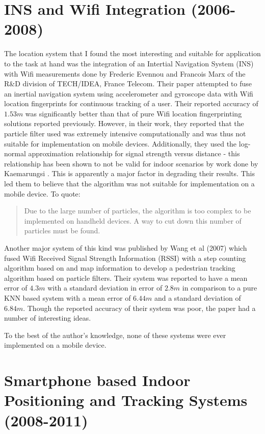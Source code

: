 \section{INS and Wifi Integration (2006-2008)}

The location system that I found the most interesting and suitable for application to the task at hand was the integration of an Intertial Navigation System (INS) with Wifi measurements done by Frederic Evennou and Francois Marx of the R\&D division of TECH/IDEA, France Telecom. Their paper \cite{Evennou} attempted to fuse an inertial navigation system using  accelerometer and gyroscope data with Wifi location fingerprints for continuous tracking of a user. Their reported accuracy of $1.53 m$ was significantly better than that of pure Wifi location fingerprinting solutions reported previously. However, in their work, they reported that the particle filter used was extremely intensive computationally and was thus not suitable for implementation on mobile devices. Additionally, they used the log-normal approximation relationship for signal strength versus distance - this relationship has been shown to not be valid for indoor scenarios by work done by Kaemarungsi \cite{KStats}. This is apparently a major factor in degrading their results. This led them to believe that the algorithm was not suitable for implementation on a mobile device. To quote:

\begin{quote}
Due to the large number of particles, the
algorithm is too complex to be implemented on handheld
devices. A way to cut down this number of particles must be
found.\cite{Evennou}
\end{quote}

Another major system of this kind was published by Wang et al (2007)\cite{Wang} which fused Wifi Received Signal Strength Information (RSSI) with a step counting algorithm based on \cite{Ladetto} and map information to develop a pedestrian tracking algorithm based on particle filters. Their system was reported to have a mean error of $4.3 m$ with a standard deviation in error of $2.8 m$ in comparison to a pure KNN based system with a mean error of $6.44 m$ and a standard deviation of $6.84 m$. Though the reported accuracy of their system was poor, the paper had a number of interesting ideas.

To the best of the author's knowledge, none of these systems were ever implemented on a mobile device.

\section{Smartphone based Indoor Positioning and Tracking Systems (2008-2011)}

